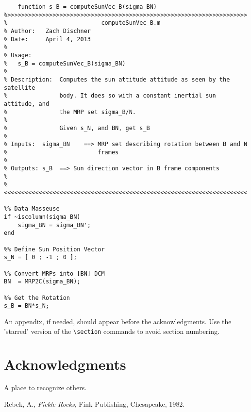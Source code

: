 \documentclass[]{aiaa-tc}%
\begin{document}
\label{APP:Code for Part B}
\begin{lstlisting}
	function s_B = computeSunVec_B(sigma_BN)
%>>>>>>>>>>>>>>>>>>>>>>>>>>>>>>>>>>>>>>>>>>>>>>>>>>>>>>>>>>>>>>>>>>>>> 
%                           computeSunVec_B.m
% Author:   Zach Dischner
% Date:     April 4, 2013
% 
% Usage:
%   s_B = computeSunVec_B(sigma_BN)
%
% Description:  Computes the sun attitude attitude as seen by the satellite 
%               body. It does so with a constant inertial sun attitude, and
%               the MRP set sigma_B/N.
% 
%               Given s_N, and BN, get s_B
% 
% Inputs:  sigma_BN    ==> MRP set describing rotation between B and N
%                          frames
%
% Outputs: s_B  ==> Sun direction vector in B frame components
% 
%<<<<<<<<<<<<<<<<<<<<<<<<<<<<<<<<<<<<<<<<<<<<<<<<<<<<<<<<<<<<<<<<<<<<<<

%% Data Masseuse 
if ~iscolumn(sigma_BN)
    sigma_BN = sigma_BN';
end

%% Define Sun Position Vector
s_N = [ 0 ; -1 ; 0 ];

%% Convert MRPs into [BN] DCM
BN  = MRP2C(sigma_BN);

%% Get the Rotation
s_B = BN*s_N;
\end{lstlisting}


An appendix, if needed, should appear before the acknowledgments.
Use the 'starred' version of the \verb|\section| commands to avoid
section numbering.

\section*{Acknowledgments}

A place to recognize others.

\begin{thebibliography}{9}%
 Rebek, A., {\it Fickle Rocks}, Fink Publishing, Chesapeake, 1982.
\end{thebibliography}
\end{document}
